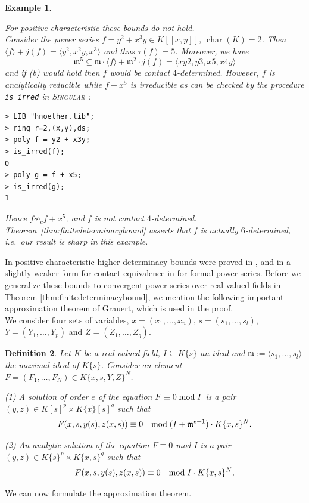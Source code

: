 \documentclass[11pt]{article}
\DeclareMathOperator{\Char}{char}
\newtheorem{Definition}{Definition}[section]
\newtheorem{Example}[Definition]{Example}
\newcommand{\fm}{\mathfrak{m}}
\begin{document}
\begin{Example} \label{ex.detbound}{\em  For positive characteristic these bounds do not hold.\\
Consider the power series
       $f=y^2+x^3y\in K[[x,y]]$, $\Char(K)=2$. Then
        $\langle f\rangle+ j(f)
     =\langle y^2,x^2y,x^3\rangle$ and thus $\tau(f)=5$. 
 Moreover, we have
       \begin{displaymath}
  \fm^5\subseteq\fm\cdot\langle f\rangle+\fm^2\cdot j(f) = \langle xy2,y3,x5,x4y\rangle 
        \end{displaymath}
       and if (b) would hold then $f$ would be contact
       $4$-determined. However, $f$ is analytically reducible
        while
       $f+x^5$ is irreducible as can be checked by the procedure
       \texttt{is\_irred} in \textsc{Singular} 
       \cite{DGPS}: 
\begin{verbatim}
> LIB "hnoether.lib";
> ring r=2,(x,y),ds;
> poly f = y2 + x3y;
> is_irred(f);
0
> poly g = f + x5;
> is_irred(g);
1   
\end{verbatim}  
Hence  $f\not\sim_c f+x^5$, and $f$ is not  contact $4$-determined.        
Theorem~\ref{thm:finitedeterminacybound} asserts that $f$ is actually 
       $6$-determined, i.e.\ our result is sharp in this example.
}
\end{Example}

In positive characteristic higher determinacy bounds  were proved 
 in \cite[Theorem 3]{BGM12}, and in a slightly weaker form for contact equivalence in   \cite[Lemma 2.6]{GrKr90} for formal power series. 
  Before we generalize these bounds to convergent power series over real valued fields in Theorem \ref{thm:finitedeterminacybound}, we mention the following important approximation theorem of Grauert, which is used in the proof. \\
 
  We consider four sets of variables, $x = (x_1, \ldots, x_n)$, $s =
  (s_1, \ldots, s_l)$, $Y = (Y_1, \ldots , Y_p)$ and $Z = (Z_1,
  \ldots, Z_q)$. 

\begin{Definition}\label{def.sol}
Let $K$ be a real valued field, $I \subseteq K\{s\}$ an ideal and $\fm:=\langle s_1,\ldots,s_l\rangle$ the maximal ideal of  $K\{s\}$.  Consider an element $F = (F_1, \ldots, F_N)  \in K\{x,s,Y,Z\}^N$.

(1) A {\em solution of order $e$} of the equation $F \equiv 0 \; {\rm mod} \;I$
  is a pair \\
\noindent $(y, z) \in K[s]^p \times K\{x\}[s]^q$ such that
\[
F(x,s, y(s), z(x,s)) \equiv 0 \quad {\rm mod} \; (I+ \fm^{e+1}) \cdot
K\{x,s\}^N.
\]

(2) An {\em analytic solution} of the equation $ F \equiv 0$ mod $I$ is a
  pair $(y, z) \in K\{s\}^p \times K\{x,s\}^q$ 
  such that
\[
F(x,s, y(s), z(x,s)) \equiv 0 \quad {\rm mod} \; I\cdot K\{x,s\}^N, 
\]
\end{Definition}
We can now formulate the approximation theorem.
 
\end{document}

